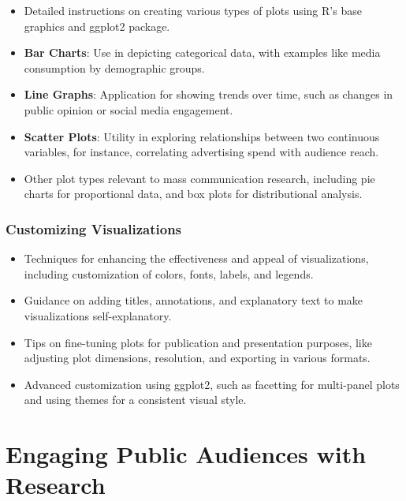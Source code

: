 \documentclass[
]{book}
\begin{document}
\begin{itemize}
\item
  Detailed instructions on creating various types of plots using R's base graphics and ggplot2 package.
\item
  \textbf{Bar Charts}: Use in depicting categorical data, with examples like media consumption by demographic groups.
\item
  \textbf{Line Graphs}: Application for showing trends over time, such as changes in public opinion or social media engagement.
\item
  \textbf{Scatter Plots}: Utility in exploring relationships between two continuous variables, for instance, correlating advertising spend with audience reach.
\item
  Other plot types relevant to mass communication research, including pie charts for proportional data, and box plots for distributional analysis.
\end{itemize}

\hypertarget{customizing-visualizations}{%
\subsection*{Customizing Visualizations}\label{customizing-visualizations}}

\begin{itemize}
\item
  Techniques for enhancing the effectiveness and appeal of visualizations, including customization of colors, fonts, labels, and legends.
\item
  Guidance on adding titles, annotations, and explanatory text to make visualizations self-explanatory.
\item
  Tips on fine-tuning plots for publication and presentation purposes, like adjusting plot dimensions, resolution, and exporting in various formats.
\item
  Advanced customization using ggplot2, such as facetting for multi-panel plots and using themes for a consistent visual style.
\end{itemize}

\hypertarget{engaging-public-audiences-with-research}{%
\chapter{Engaging Public Audiences with Research}\label{engaging-public-audiences-with-research}}
\end{document}
